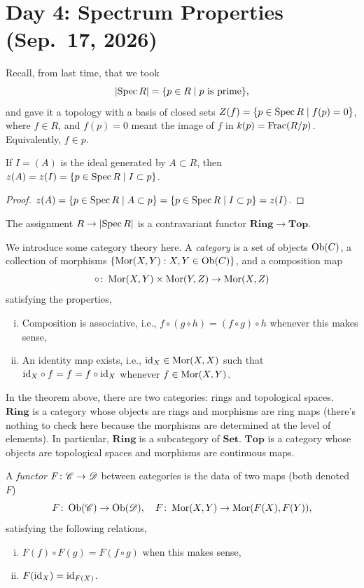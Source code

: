 \section{Day 4: Spectrum Properties (Sep.\ 17, 2026)}
Recall, from last time, that we took
\[ \left\lvert \operatorname{Spec} R \right\rvert = \{p \in R \mid p \text{ is prime}\}, \]
and gave it a topology with a basis of closed sets $Z(f) = \{p \in \operatorname{Spec} R \mid f(p) = 0\}$, where $f \in R$, and $f(p) = 0$ meant the image of $f$ in $k(p) = \operatorname{Frac}(R/p)$. Equivalently, $f \in p$.

\begin{theorem} \label{thm:vanishing_locus_of_ideal}
    If $I = (A)$ is the ideal generated by $A \subset R$, then $z(A) = z(I) = \{p \in \operatorname{Spec} R \mid I \subset p\}$.
\end{theorem}
\begin{proof}
    $z(A) = \{p \in \operatorname{Spec} R \mid A \subset p\} = \{p \in \operatorname{Spec} R \mid I \subset p\} = z(I)$.
\end{proof}

\begin{theorem} \label{thm:ring_to_spectrum_contravariant}
    The assignment $R \to \left\lvert \operatorname{Spec} R \right\rvert$ is a contravariant functor $\mathbf{Ring} \to \mathbf{Top}$.
\end{theorem}
We introduce some category theory here. A \textit{category} is a set of objects $\operatorname{Ob}(C)$, a collection of morphisms $\{\operatorname{Mor}(X, Y) : X, Y \in \operatorname{Ob}(C)\}$, and a composition map
\[ \circ \colon \operatorname{Mor}(X, Y) \times \operatorname{Mor}(Y, Z) \to \operatorname{Mor}(X, Z) \]
satisfying the properties,
\begin{enumerate}[(i)]
    \item Composition is associative, i.e., $f \circ (g \circ h) = (f \circ g) \circ h$ whenever this makes sense,
    \item An identity map exists, i.e., $\mathrm{id}_X \in \operatorname{Mor}(X, X)$ such that $\mathrm{id}_X \circ f = f = f \circ \mathrm{id}_X$ whenever $f \in \operatorname{Mor}(X, Y)$.
\end{enumerate}

In the theorem above, there are two categories: rings and topological spaces. $\mathbf{Ring}$ is a category whose objects are rings and morphisms are ring maps (there's nothing to check here because the morphisms are determined at the level of elements). In particular, $\mathbf{Ring}$ is a subcategory of $\mathbf{Set}$. $\mathbf{Top}$ is a category whose objects are topological spaces and morphisms are continuous maps.

A \textit{functor} $F \colon \mathscr C \to \mathscr D$ between categories is the data of two maps (both denoted $F$)
\[ F \colon \operatorname{Ob}(\mathscr C) \to \operatorname{Ob}(\mathscr D), \quad F \colon \operatorname{Mor}(X, Y) \to \operatorname{Mor}(F(X), F(Y)), \]
satisfying the following relations,
\begin{enumerate}[(i)]
    \item $F(f) \circ F(g) = F(f \circ g)$ when this makes sense,
    \item $F(\mathrm{id}_X) = \mathrm{id}_{F(X)}$.
\end{enumerate}

